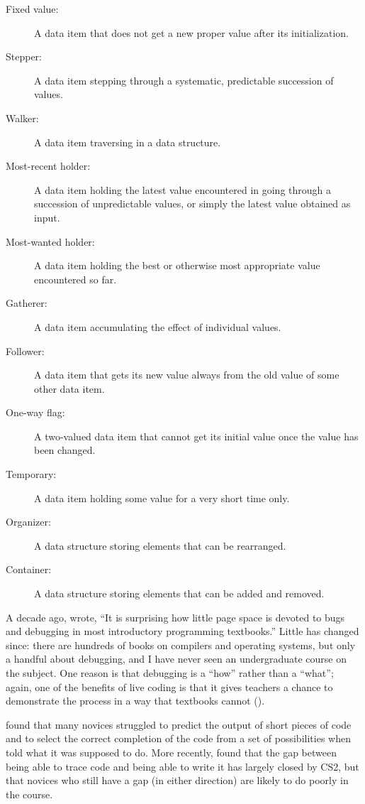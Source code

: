 \begin{description}
\item[Fixed value:]
A data item that does not get a new proper value after its
initialization.
\item[Stepper:]
A data item stepping through a systematic, predictable succession of
values.
\item[Walker:]
A data item traversing in a data structure.
\item[Most-recent holder:]
A data item holding the latest value encountered in going through a
succession of unpredictable values, or simply the latest value
obtained as input.
\item[Most-wanted holder:]
A data item holding the best or otherwise most appropriate value
encountered so far.
\item[Gatherer:]
A data item accumulating the effect of individual values.
\item[Follower:]
A data item that gets its new value always from the old value of
some other data item.
\item[One-way flag:]
A two-valued data item that cannot get its initial value once the
value has been changed.
\item[Temporary:]
A data item holding some value for a very short time only.
\item[Organizer:]
A data structure storing elements that can be rearranged.
\item[Container:]
A data structure storing elements that can be added and removed.
\end{description}


A decade ago, \cite{McCa2008} wrote, ``It is surprising how little
page space is devoted to bugs and debugging in most introductory
programming textbooks.'' Little has changed since: there are hundreds of
books on compilers and operating systems, but only a handful about
debugging, and I have never seen an undergraduate course on the subject.
One reason is that debugging is a ``how'' rather than a ``what''; again, one
of the benefits of live coding is that it gives teachers a chance to
demonstrate the process in a way that textbooks cannot
().

\cite{List2004,List2009} found that many novices struggled to predict
the output of short pieces of code and to select the correct completion
of the code from a set of possibilities when told what it was supposed
to do. More recently, \cite{Harr2018} found that the gap between
being able to trace code and being able to write it has largely closed
by CS2, but that novices who still have a gap (in either direction) are
likely to do poorly in the course.

